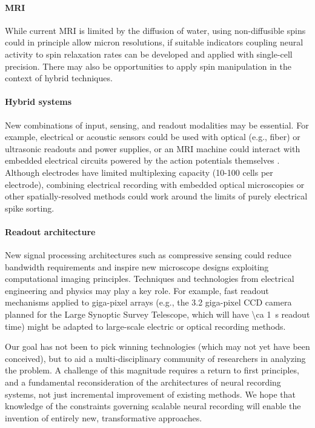 \paragraph{MRI} While current MRI is limited by the diffusion of water, using non-diffusible spins could in principle allow micron resolutions, if suitable  indicators coupling neural activity to spin relaxation rates can be developed and applied with single-cell precision. There may also be opportunities to apply spin manipulation in the context of hybrid techniques.

\paragraph{Hybrid systems} New combinations of input, sensing, and readout modalities may be essential. For example, electrical or acoustic sensors could be used with optical \cite{sadek2010wiring} (e.g., fiber) or ultrasonic readouts and power supplies, or an MRI machine could interact with embedded electrical circuits powered by the action potentials themselves \cite{JasanoffInductorsGrant}. Although electrodes have limited multiplexing capacity (10-100 cells per electrode), combining electrical recording with embedded optical microscopies or other spatially-resolved methods could work around the limits of purely electrical spike sorting.

\paragraph{Readout architecture} New signal processing architectures such as compressive sensing could reduce bandwidth requirements and inspire new microscope designs exploiting computational imaging principles. Techniques and technologies from electrical engineering and physics may play a key role. For example, fast readout mechanisms \cite{lauxtermann2001mega} applied to giga-pixel arrays (e.g., the 3.2 giga-pixel CCD camera planned for the Large Synoptic Survey Telescope, which will have \SI{\ca 1}{\second} readout time) might be adapted to large-scale electric or optical recording methods.

Our goal has not been to pick winning technologies (which may not yet have been conceived), but to aid a multi-disciplinary community of researchers in analyzing the problem. 
A challenge of this magnitude requires a return to first principles, and a fundamental reconsideration of the architectures of neural recording systems, not just incremental improvement of existing methods.
We hope that knowledge of the constraints governing scalable neural recording will enable the invention of entirely new, transformative approaches.

